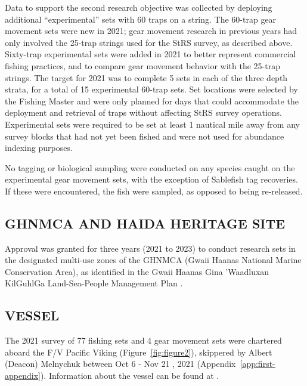 \documentclass[12pt]{article}\usepackage[]{graphicx}\usepackage[]{color}
\begin{document}
Data to support the second research objective was collected by deploying additional ``experimental'' sets with 60 traps on a string. The 60-trap gear movement sets were new in 2021; gear movement research in previous years had only involved the 25-trap strings used for the StRS survey, as described above. Sixty-trap experimental sets were added in 2021 to better represent commercial fishing practices, and to compare gear movement behavior with the 25-trap strings. The target for 2021 was to complete 5 sets in each of the three depth strata, for a total of 15 experimental 60-trap sets. Set locations were selected by the Fishing Master and were only planned for days that could accommodate the deployment and retrieval of traps without affecting StRS survey operations. Experimental sets were required to be set at least 1 nautical mile away from any survey blocks that had not yet been fished and were not used for abundance indexing purposes.

No tagging or biological sampling were conducted on any species caught on the experimental gear movement sets, with the exception of Sablefish tag recoveries. If these were encountered, the fish were sampled, as opposed to being re-released.

\hypertarget{ghnmca-and-haida-heritage-site}{%
\subsection{GHNMCA AND HAIDA HERITAGE SITE}\label{ghnmca-and-haida-heritage-site}}

Approval was granted for three years (2021 to 2023) to conduct research sets in the designated multi-use zones of the GHNMCA (Gwaii Haanas National Marine Conservation Area), as identified in the Gwaii Haanas Gina 'Waadluxan KilGuhlGa Land-Sea-People Management Plan .

\hypertarget{vessel}{%
\subsection{VESSEL}\label{vessel}}

The 2021 survey of 77 fishing sets and 4 gear movement sets were chartered aboard the F/V Pacific Viking (Figure~\ref{fig:figure2}), skippered by Albert (Deacon) Melnychuk between Oct 6 - Nov 21 , 2021 (Appendix~\ref{app:first-appendix}). Information about the vessel can be found at .
\end{document}
